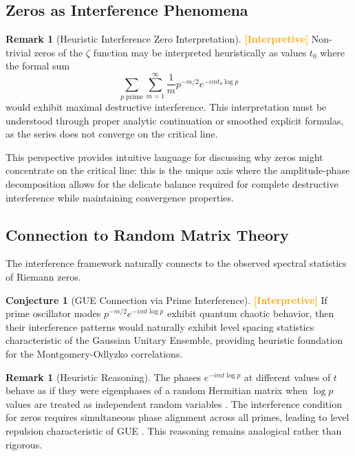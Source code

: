 \documentclass[12pt]{article}
\theoremstyle{plain}
\theoremstyle{definition}
\newtheorem{remark}[theorem]{Remark}
\newtheorem{conjecture}[theorem]{Conjecture}
\newcommand{\statusinterp}{\textcolor{orange}{\textbf{[Interpretive]}}}
\begin{document}
\subsection{Zeros as Interference Phenomena}

\begin{remark}[Heuristic Interference Zero Interpretation] \statusinterp
Non-trivial zeros of the $\zeta$ function may be interpreted heuristically as values $t_0$ where the formal sum
$$
\sum_{p \text{ prime}}\sum_{m=1}^{\infty} \frac{1}{m} p^{-m/2} e^{-imt_0\log p}
$$
would exhibit maximal destructive interference. This interpretation must be understood through proper analytic continuation or smoothed explicit formulas, as the series does not converge on the critical line.
\end{remark}

This perspective provides intuitive language for discussing why zeros might concentrate on the critical line: this is the unique axis where the amplitude-phase decomposition allows for the delicate balance required for complete destructive interference while maintaining convergence properties.

\subsection{Connection to Random Matrix Theory}

The interference framework naturally connects to the observed spectral statistics of Riemann zeros.

\begin{conjecture}[GUE Connection via Prime Interference] \statusinterp
If prime oscillator modes $p^{-m/2}e^{-imt\log p}$ exhibit quantum chaotic behavior, then their interference patterns would naturally exhibit level spacing statistics characteristic of the Gaussian Unitary Ensemble, providing heuristic foundation for the Montgomery-Odlyzko correlations.
\end{conjecture}

\begin{remark}[Heuristic Reasoning]
The phases $e^{-imt\log p}$ at different values of $t$ behave as if they were eigenphases of a random Hermitian matrix when $\log p$ values are treated as independent random variables \cite{sarnak1999}. The interference condition for zeros requires simultaneous phase alignment across all primes, leading to level repulsion characteristic of GUE \cite{berry1985}. This reasoning remains analogical rather than rigorous.
\end{remark}
\end{document}
